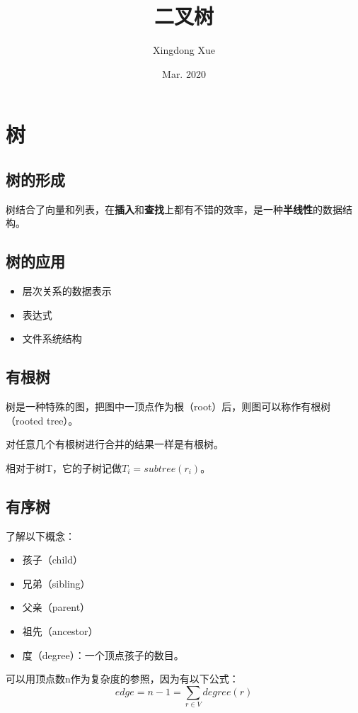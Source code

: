 \documentclass{article}
\title{二叉树}
\author{Xingdong Xue}
\date{Mar. 2020}
\begin{document}
\maketitle

\section{树}
\subsection{树的形成}
树结合了向量和列表，在\textbf{插入}和\textbf{查找}上都有不错的效率，是一种\textbf{半线性}的数据结构。

\subsection{树的应用}
\begin{itemize}
  \item 层次关系的数据表示
  \item 表达式
  \item 文件系统结构
\end{itemize}

\subsection{有根树}

树是一种特殊的图，把图中一顶点作为根（root）后，则图可以称作有根树（rooted tree）。

对任意几个有根树进行合并的结果一样是有根树。

相对于树T，它的子树记做$T_i = subtree(r_i)$。

\subsection{有序树}
了解以下概念：

\begin{itemize}
  \item 孩子（child）
  \item 兄弟（sibling）
  \item 父亲（parent）
  \item 祖先（ancestor）
  \item 度（degree）：一个顶点孩子的数目。
\end{itemize}

可以用顶点数n作为复杂度的参照，因为有以下公式：
$$edge = n-1 = \sum_{r \in V}{degree(r)} $$
\end{document}
